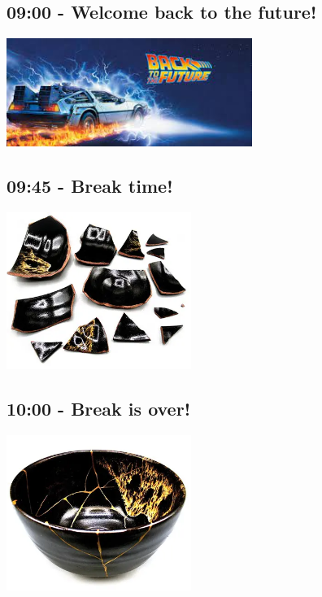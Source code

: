 \documentclass[12pt,notes]{beamer}
\begin{document}
\begin{frame}[label={sec:orga603dea}]{}
\section{09:00 - Welcome back to the future!}

\begin{center}
\includegraphics[width=8cm]{./img/back_to_the_future.jpeg}
\end{center}
\end{frame}
\begin{frame}[label={sec:orge18bfb6}]{}
\section{09:45 - Break time!}

\begin{center}
\includegraphics[width=6cm]{./img/kintsugi_broken.png}
\end{center}
\end{frame}

\begin{frame}[label={sec:orgb32133c}]{}
\section{10:00 - Break is over!}

\begin{center}
\includegraphics[width=6cm]{./img/kintsugi_repaired.png}
\end{center}
\end{frame}
\end{document}
